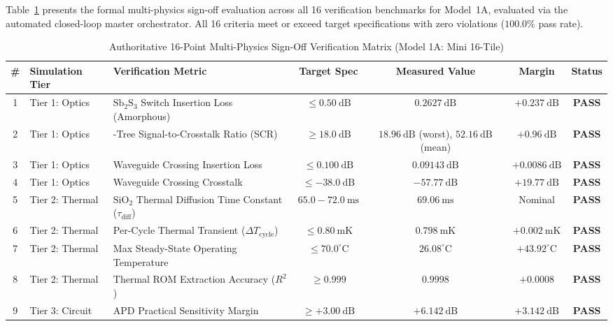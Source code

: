 \documentclass[journal]{IEEEtran}
\begin{document}
Table~\ref{tab:signoff_matrix} presents the formal multi-physics sign-off evaluation across all 16 verification benchmarks for Model~1A, evaluated via the automated closed-loop master orchestrator. All 16 criteria meet or exceed target specifications with zero violations ($100.0\%$ pass rate).

\begin{table}[!htbp]
\centering
\footnotesize
\setlength{\tabcolsep}{3.5pt}
\caption{Authoritative 16-Point Multi-Physics Sign-Off Verification Matrix (Model 1A: Mini 16-Tile)}
\label{tab:signoff_matrix}
\begin{tabularx}{\textwidth}{c l >{\raggedright\arraybackslash}X c c c c}
\toprule
\textbf{\#} & \textbf{Simulation Tier} & \textbf{Verification Metric} & \textbf{Target Spec} & \textbf{Measured Value} & \textbf{Margin} & \textbf{Status} \\
\midrule
1 & Tier 1: Optics & $\mathrm{Sb_2S_3}$ Switch Insertion Loss (Amorphous) & $\le 0.50~\mathrm{dB}$ & $\mathbf{0.2627~\mathrm{dB}}$ & $+0.237~\mathrm{dB}$ & \textbf{PASS} \\
2 & Tier 1: Optics & 16-Tree Signal-to-Crosstalk Ratio (SCR) & $\ge 18.0~\mathrm{dB}$ & $\mathbf{18.96~\mathrm{dB}}$ (worst), $52.16~\mathrm{dB}$ (mean) & $+0.96~\mathrm{dB}$ & \textbf{PASS} \\
3 & Tier 1: Optics & Waveguide Crossing Insertion Loss & $\le 0.100~\mathrm{dB}$ & $\mathbf{0.09143~\mathrm{dB}}$ & $+0.0086~\mathrm{dB}$ & \textbf{PASS} \\
4 & Tier 1: Optics & Waveguide Crossing Crosstalk & $\le -38.0~\mathrm{dB}$ & $\mathbf{-57.77~\mathrm{dB}}$ & $+19.77~\mathrm{dB}$ & \textbf{PASS} \\
\midrule
5 & Tier 2: Thermal & $\mathrm{SiO_2}$ Thermal Diffusion Time Constant ($\tau_{\mathrm{diff}}$) & $65.0 - 72.0~\mathrm{ms}$ & $\mathbf{69.06~\mathrm{ms}}$ & Nominal & \textbf{PASS} \\
6 & Tier 2: Thermal & Per-Cycle Thermal Transient ($\Delta T_{\mathrm{cycle}}$) & $\le 0.80~\mathrm{mK}$ & $\mathbf{0.798~\mathrm{mK}}$ & $+0.002~\mathrm{mK}$ & \textbf{PASS} \\
7 & Tier 2: Thermal & Max Steady-State Operating Temperature & $\le 70.0^\circ\mathrm{C}$ & $\mathbf{26.08^\circ\mathrm{C}}$ & $+43.92^\circ\mathrm{C}$ & \textbf{PASS} \\
8 & Tier 2: Thermal & Thermal ROM Extraction Accuracy ($R^2$) & $\ge 0.999$ & $\mathbf{0.9998}$ & $+0.0008$ & \textbf{PASS} \\
\midrule
9 & Tier 3: Circuit & APD Practical Sensitivity Margin & $\ge +3.00~\mathrm{dB}$ & $\mathbf{+6.142~\mathrm{dB}}$ & $+3.142~\mathrm{dB}$ & \textbf{PASS} \\

\end{tabularx}
\end{table}
\end{document}
